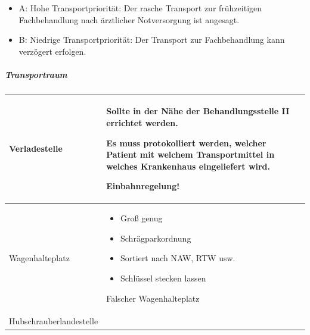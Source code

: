 \documentclass{article}
\begin{document}
\begin{itemize}
\item A: Hohe Transportpriorit\"at: Der rasche Transport zur
fr\"uhzeitigen Fachbehandlung nach \"arztlicher Notversorgung ist
angesagt. 

\item B: Niedrige Transportpriorit\"at: Der Transport zur Fachbehandlung
kann verz\"ogert erfolgen. 

\end{itemize}
\subparagraph{Transportraum}
\begin{center}
\tablehead{}\begin{supertabular}{|m{2.365cm}m{5.8640003cm}m{4.8710003cm}|}
\hline
Verladestelle

 &
Sollte in der N\"ahe der Behandlungsstelle II errichtet werden.

Es muss protokolliert werden, welcher Patient mit welchem
Transportmittel in welches Krankenhaus eingeliefert wird.

Einbahnregelung!

 &
 \par

\\\hline
Wagenhalte\-platz

 &
\begin{itemize}
\item Gro{\ss} genug

\item Schr\"agparkordnung 

\item Sortiert nach NAW, RTW usw.

\item Schl\"ussel stecken lassen

\end{itemize}
 \par

\centering Falscher Wagenhalteplatz\par

 &
 \par

\\\hline
Hubschrauber\-landestelle


\end{supertabular}
\end{center}
\end{document}
